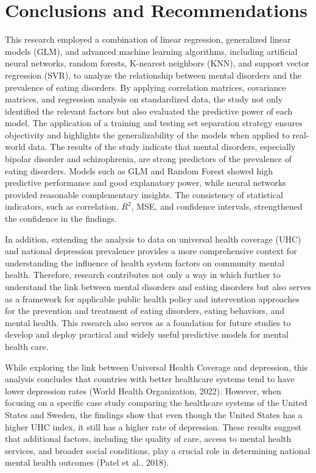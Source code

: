 \section{Conclusions and Recommendations}
\label{sec:con}

This research employed a combination of linear regression, generalized linear models (GLM), and advanced machine learning algorithms, including artificial neural networks, random forests, K-nearest neighbors (KNN), and support vector regression (SVR), to analyze the relationship between mental disorders and the prevalence of eating disorders. By applying correlation matrices, covariance matrices, and regression analysis on standardized data, the study not only identified the relevant factors but also evaluated the predictive power of each model.
The application of a training and testing set separation strategy ensures objectivity and highlights the generalizability of the models when applied to real-world data. The results of the study indicate that mental disorders, especially bipolar disorder and schizophrenia, are strong predictors of the prevalence of eating disorders. Models such as GLM and Random Forest showed high predictive performance and good explanatory power, while neural networks provided reasonable complementary insights. The consistency of statistical indicators, such as correlation, $R^2$, MSE, and confidence intervals, strengthened the confidence in the findings.

In addition, extending the analysis to data on universal health coverage (UHC) and national depression prevalence provides a more comprehensive context for understanding the influence of health system factors on community mental health. Therefore, research contributes not only a way in which further to understand the link between mental disorders and eating disorders but also serves as a framework for applicable public health policy and intervention approaches for the prevention and treatment of eating disorders, eating behaviors, and mental health. This research also serves as a foundation for future studies to develop and deploy practical and widely useful predictive models for mental health care.

While exploring the link between Universal Health Coverage and depression, this analysis concludes that countries with better healthcare systems tend to have lower depression rates (World Health Organization, 2022). However, when focusing on a specific case study comparing the healthcare systems of the United States and Sweden, the findings show that even though the United States has a higher UHC index, it still has a higher rate of depression. These results suggest that additional factors, including the quality of care, access to mental health services, and broader social conditions, play a crucial role in determining national mental health outcomes (Patel et al., 2018).

